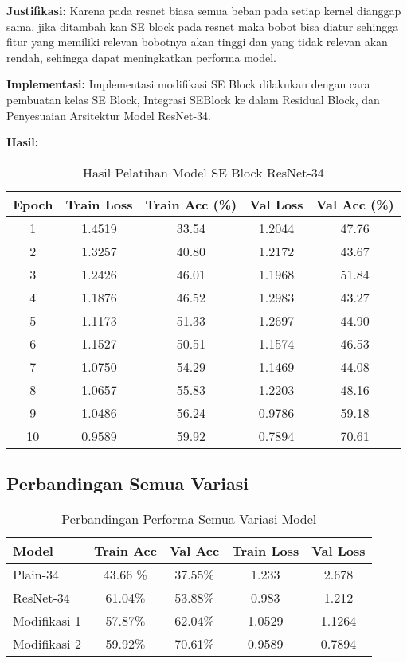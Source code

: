 \documentclass[11pt,a4paper]{article}
\begin{document}
\textbf{Justifikasi:} Karena pada resnet biasa semua beban pada setiap kernel dianggap sama, jika ditambah kan SE block pada resnet maka bobot bisa diatur sehingga fitur yang memiliki relevan bobotnya akan tinggi dan yang tidak relevan akan rendah, sehingga dapat meningkatkan performa model.

\textbf{Implementasi:} Implementasi modifikasi SE Block dilakukan dengan cara pembuatan kelas SE Block, Integrasi SEBlock ke dalam Residual Block, dan Penyesuaian Arsitektur Model ResNet-34.

\textbf{Hasil:} 

\begin{table}[H]
\centering
\caption{Hasil Pelatihan Model SE Block ResNet-34}
\label{tab:Preactivation SEBlock-resnet34-results}
\begin{tabular}{ccccc}
\toprule
\textbf{Epoch} & \textbf{Train Loss} & \textbf{Train Acc (\%)} & \textbf{Val Loss} & \textbf{Val Acc (\%)} \\
\midrule
1 & 1.4519 & 33.54 & 1.2044 & 47.76 \\
2 & 1.3257 & 40.80 & 1.2172 & 43.67 \\
3 & 1.2426 & 46.01 & 1.1968 & 51.84 \\
4 & 1.1876 & 46.52 & 1.2983 & 43.27 \\
5 & 1.1173 & 51.33 & 1.2697 & 44.90 \\
6 & 1.1527 & 50.51 & 1.1574 & 46.53 \\
7 & 1.0750 & 54.29 & 1.1469 & 44.08 \\
8 & 1.0657 & 55.83 & 1.2203 & 48.16 \\
9 & 1.0486 & 56.24 & 0.9786 & 59.18 \\
10 & 0.9589 & 59.92 & 0.7894 & 70.61 \\

\bottomrule
\end{tabular}
\end{table}

\subsection{Perbandingan Semua Variasi}

\begin{table}[H]
\centering
\caption{Perbandingan Performa Semua Variasi Model}
\label{tab:all-comparison}
\begin{tabular}{lcccc}
\toprule
\textbf{Model} & \textbf{Train Acc} & \textbf{Val Acc} & \textbf{Train Loss} & \textbf{Val Loss} \\
\midrule
Plain-34 & 43.66 \% & 37.55\% & 1.233 & 2.678 \\
ResNet-34 &  61.04\% & 53.88\% & 0.983 & 1.212 \\
Modifikasi 1 & 57.87\% & 62.04\% &  1.0529 & 1.1264\\
Modifikasi 2 & 59.92\% & 70.61\% &  0.9589 &  0.7894\\
\bottomrule
\end{tabular}
\end{table}
\end{document}
